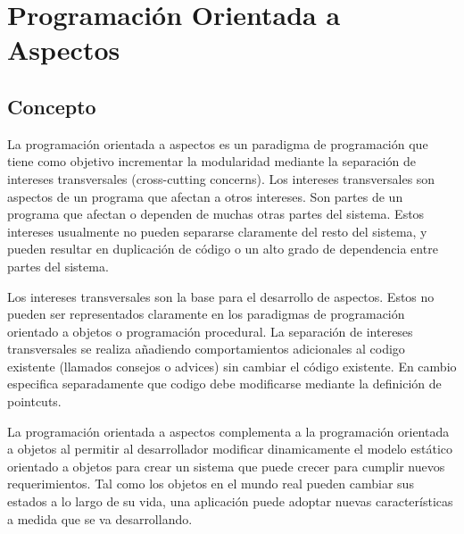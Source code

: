 \section{Programación Orientada a Aspectos}
\label{sec:aop}

\subsection{Concepto}

La programación orientada a aspectos es un paradigma de programación que tiene
como objetivo incrementar la modularidad mediante la separación de intereses
transversales (cross-cutting concerns). 
Los intereses transversales son aspectos de un programa que afectan a otros
intereses. Son partes de un programa que afectan o dependen de muchas
otras partes del sistema.
Estos intereses usualmente no pueden separarse claramente del resto del
sistema, y pueden resultar en duplicación de código o un alto grado de
dependencia entre partes del sistema.


Los intereses transversales son la base para el desarrollo de aspectos. Estos no
pueden ser representados claramente en los paradigmas de programación orientado
a objetos o programación procedural.
La separación de intereses transversales se realiza añadiendo comportamientos
adicionales al codigo existente (llamados consejos o advices) sin cambiar el
código existente. En cambio especifica separadamente que codigo debe modificarse
mediante la definición de pointcuts. 

La programación orientada a aspectos complementa a la programación orientada a
objetos al permitir al desarrollador modificar dinamicamente el modelo estático
orientado a objetos para crear un sistema que puede crecer para cumplir nuevos
requerimientos. Tal como los objetos en el mundo real pueden cambiar sus estados
a lo largo de su vida, una aplicación puede adoptar nuevas características a
medida que se va desarrollando. \cite{Introduction_To_Aspect}


